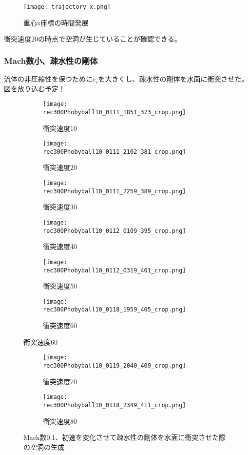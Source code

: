 \documentclass[]{jsarticle}
\begin{document}
\begin{figure}[H]
  \centering
  \texttt{[image: trajectory\_x.png]}
  \caption{重心x座標の時間発展}
  \label{fig:trajectory}
\end{figure}

衝突速度20の時点で空洞が生じていることが確認できる。


\subsubsection{Mach数小、疎水性の剛体}
流体の非圧縮性を保つために$c_s$を大きくし、疎水性の剛体を水面に衝突させた。
図を放り込む予定！
\begin{figure}[H]
  \centering
\begin{subfigure}{0.3\columnwidth}
  \centering
  \texttt{[image: rec300Phobyball10\_0111\_1851\_373\_crop.png]}
  \caption{衝突速度10}
  \label{fig:MSPhobyvel10}
\end{subfigure}
\begin{subfigure}{0.3\columnwidth}
  \centering
  \texttt{[image: rec300Phobyball10\_0111\_2102\_381\_crop.png]}
  \caption{衝突速度20}
  \label{fig:MSPhobyvel20}
\end{subfigure}
\begin{subfigure}{0.3\columnwidth}
  \centering
  \texttt{[image: rec300Phobyball10\_0111\_2259\_389\_crop.png]}
  \caption{衝突速度30}
  \label{fig:MSPhobyvel30}
\end{subfigure}
\begin{subfigure}{0.3\columnwidth}
  \centering
  \texttt{[image: rec300Phobyball10\_0112\_0109\_395\_crop.png]}
  \caption{衝突速度40}
  \label{fig:MSPhobyvel40}
\end{subfigure}
\begin{subfigure}{0.3\columnwidth}
  \centering
  \texttt{[image: rec300Phobyball10\_0112\_0319\_401\_crop.png]}
  \caption{衝突速度50}
  \label{fig:MSPhobyvel50}
\end{subfigure}
\begin{subfigure}{0.3\columnwidth}
  \centering
  \texttt{[image: rec300Phobyball10\_0118\_1959\_405\_crop.png]}
  \caption{衝突速度60}
  \label{fig:MSPhobyvel60}
\end{subfigure}
\end{figure}
\clearpage
\begin{figure}
\ContinuedFloat
  \begin{subfigure}{0.3\columnwidth}
  \centering
  \texttt{[image: rec300Phobyball10\_0119\_2040\_409\_crop.png]}
  \caption{衝突速度70}
  \label{fig:MSPhobyvel70}
\end{subfigure}
\begin{subfigure}{0.3\columnwidth}
  \centering
  \texttt{[image: rec300Phobyball10\_0118\_2349\_411\_crop.png]}
  \caption{衝突速度80}
  \label{fig:MSPhobyvel80}
\end{subfigure}
\caption{Mach数0.1、初速を変化させて疎水性の剛体を水面に衝突させた際の空洞の生成}
\label{fig:MachSPhoby}
\end{figure}
\end{document}
